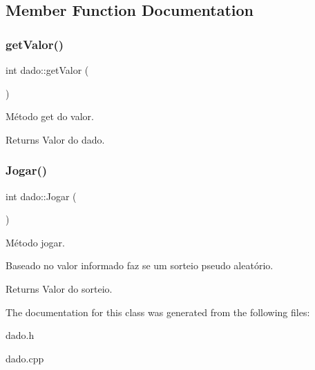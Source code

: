 \subsection{Member Function Documentation}
\mbox{\label{classdado_a94a38beee28359ee6005889d5d32e754}} 
\subsubsection{\texorpdfstring{get\+Valor()}{getValor()}}
{\footnotesize\ttfamily int dado\+::get\+Valor (\begin{DoxyParamCaption}{ }\end{DoxyParamCaption})}



Método get do valor. 

\begin{DoxyReturn}{Returns}
Valor do dado. 
\end{DoxyReturn}
\mbox{\label{classdado_a768c4cc0bfb5f9d4b7dbdeb2fb11c5fa}} 
\subsubsection{\texorpdfstring{Jogar()}{Jogar()}}
{\footnotesize\ttfamily int dado\+::\+Jogar (\begin{DoxyParamCaption}{ }\end{DoxyParamCaption})}



Método jogar. 

Baseado no valor informado faz se um sorteio pseudo aleatório. \begin{DoxyReturn}{Returns}
Valor do sorteio. 
\end{DoxyReturn}


The documentation for this class was generated from the following files\+:\begin{DoxyCompactItemize}
\item 
dado.\+h\item 
dado.\+cpp\end{DoxyCompactItemize}
